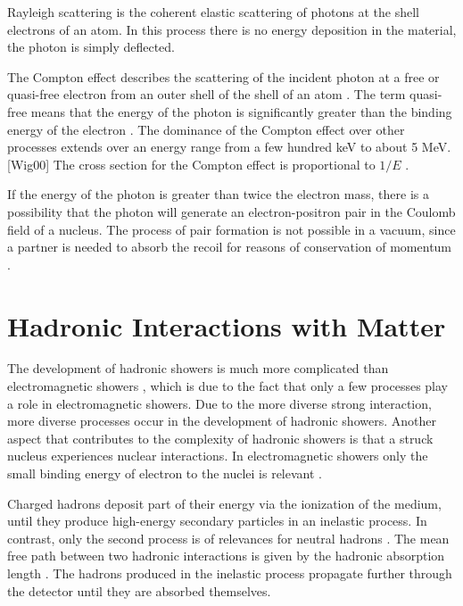 \documentclass[12pt, a4paper]{thesis}
\begin{document}
Rayleigh scattering is the coherent elastic scattering of photons at
the shell electrons of an atom. In this process there is no energy
deposition in the material, the photon is simply deflected.

The Compton effect describes the scattering of the incident photon at
a free or quasi-free electron from an outer shell of the shell of an
atom \cite{wigman18}. The term quasi-free means that the energy of the
photon is significantly greater than the binding energy of the
electron \cite{kolanoski16}. The dominance of the Compton effect over
other processes extends over an energy range from a few hundred keV to
about 5 MeV.[Wig00] The cross section for the Compton effect is
proportional to $1/E$ \cite{wigman18}.

If the energy of the photon is greater than twice the electron mass,
there is a possibility that the photon will generate an
electron-positron pair in the Coulomb field of a nucleus. The process
of pair formation is not possible in a vacuum, since a partner is
needed to absorb the recoil for reasons of conservation of momentum
\cite{wigman18}.

\clearpage
\section{Hadronic Interactions with Matter}
\label{sec:org39e1a53}

The development of hadronic showers is much more complicated than
electromagnetic showers \cite{wigman18}, which is due to the fact that
only a few processes play a role in electromagnetic showers.  Due to
the more diverse strong interaction, more diverse processes occur in
the development of hadronic showers. Another aspect that contributes
to the complexity of hadronic showers is that a struck nucleus
experiences nuclear interactions. In electromagnetic showers only the
small binding energy of electron to the nuclei is relevant
\cite{wigman18}.

Charged hadrons deposit part of their energy via the ionization of the
medium, until they produce high-energy secondary particles in an
inelastic process.  In contrast, only the second process is of
relevances for neutral hadrons \cite{wigman18,fabjan03}. The mean free
path between two hadronic interactions is given by the hadronic
absorption length \cite{fabjan03}. The hadrons produced in the
inelastic process propagate further through the detector until they
are absorbed themselves.
\end{document}
